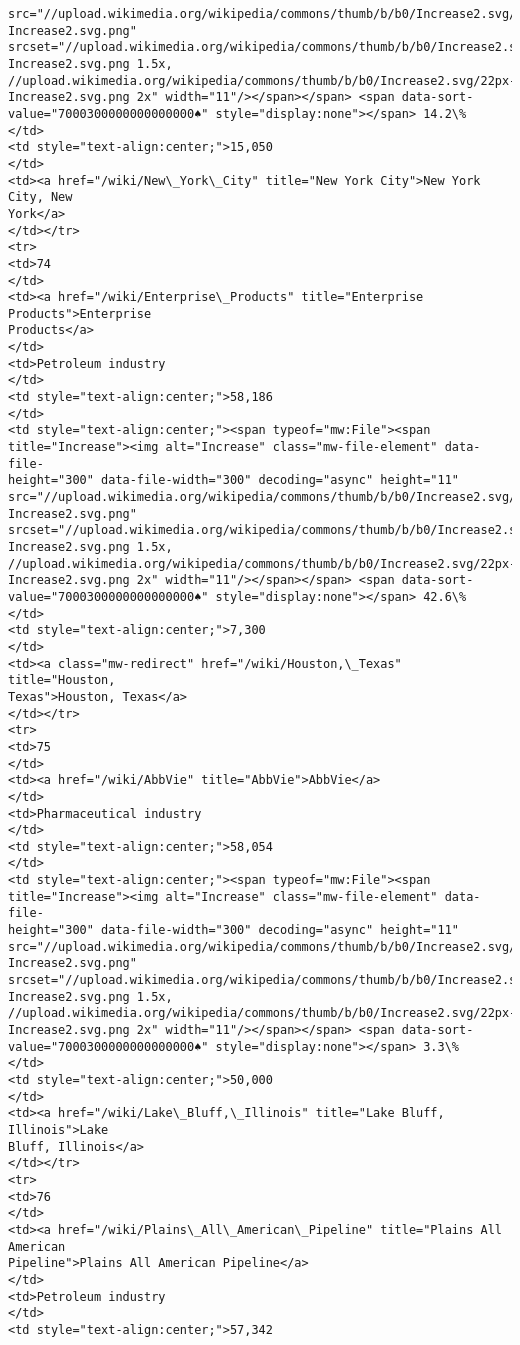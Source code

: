 \documentclass[11pt]{article}
\begin{document}
\begin{Verbatim}[commandchars=\\\{\}]
src="//upload.wikimedia.org/wikipedia/commons/thumb/b/b0/Increase2.svg/11px-
Increase2.svg.png"
srcset="//upload.wikimedia.org/wikipedia/commons/thumb/b/b0/Increase2.svg/17px-
Increase2.svg.png 1.5x,
//upload.wikimedia.org/wikipedia/commons/thumb/b/b0/Increase2.svg/22px-
Increase2.svg.png 2x" width="11"/></span></span> <span data-sort-
value="7000300000000000000♠" style="display:none"></span> 14.2\%
</td>
<td style="text-align:center;">15,050
</td>
<td><a href="/wiki/New\_York\_City" title="New York City">New York City, New
York</a>
</td></tr>
<tr>
<td>74
</td>
<td><a href="/wiki/Enterprise\_Products" title="Enterprise Products">Enterprise
Products</a>
</td>
<td>Petroleum industry
</td>
<td style="text-align:center;">58,186
</td>
<td style="text-align:center;"><span typeof="mw:File"><span
title="Increase"><img alt="Increase" class="mw-file-element" data-file-
height="300" data-file-width="300" decoding="async" height="11"
src="//upload.wikimedia.org/wikipedia/commons/thumb/b/b0/Increase2.svg/11px-
Increase2.svg.png"
srcset="//upload.wikimedia.org/wikipedia/commons/thumb/b/b0/Increase2.svg/17px-
Increase2.svg.png 1.5x,
//upload.wikimedia.org/wikipedia/commons/thumb/b/b0/Increase2.svg/22px-
Increase2.svg.png 2x" width="11"/></span></span> <span data-sort-
value="7000300000000000000♠" style="display:none"></span> 42.6\%
</td>
<td style="text-align:center;">7,300
</td>
<td><a class="mw-redirect" href="/wiki/Houston,\_Texas" title="Houston,
Texas">Houston, Texas</a>
</td></tr>
<tr>
<td>75
</td>
<td><a href="/wiki/AbbVie" title="AbbVie">AbbVie</a>
</td>
<td>Pharmaceutical industry
</td>
<td style="text-align:center;">58,054
</td>
<td style="text-align:center;"><span typeof="mw:File"><span
title="Increase"><img alt="Increase" class="mw-file-element" data-file-
height="300" data-file-width="300" decoding="async" height="11"
src="//upload.wikimedia.org/wikipedia/commons/thumb/b/b0/Increase2.svg/11px-
Increase2.svg.png"
srcset="//upload.wikimedia.org/wikipedia/commons/thumb/b/b0/Increase2.svg/17px-
Increase2.svg.png 1.5x,
//upload.wikimedia.org/wikipedia/commons/thumb/b/b0/Increase2.svg/22px-
Increase2.svg.png 2x" width="11"/></span></span> <span data-sort-
value="7000300000000000000♠" style="display:none"></span> 3.3\%
</td>
<td style="text-align:center;">50,000
</td>
<td><a href="/wiki/Lake\_Bluff,\_Illinois" title="Lake Bluff, Illinois">Lake
Bluff, Illinois</a>
</td></tr>
<tr>
<td>76
</td>
<td><a href="/wiki/Plains\_All\_American\_Pipeline" title="Plains All American
Pipeline">Plains All American Pipeline</a>
</td>
<td>Petroleum industry
</td>
<td style="text-align:center;">57,342

\end{Verbatim}
\end{document}
